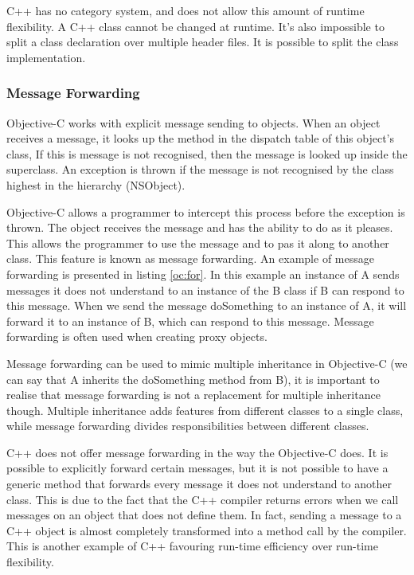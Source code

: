\documentclass[12pt, a4paper, twocolumn]{article}
\begin{document}
C++ has no category system, and does not allow this amount of runtime flexibility. A C++ class cannot be changed at runtime. It's also impossible to split a class declaration over multiple header files. It is possible to split the class implementation. 

\subsubsection{Message Forwarding}
\label{sec:message}
Objective-C works with explicit message sending to objects. When an object receives a message, it looks up the method in the dispatch table of this object's class, If this is message is not recognised, then the message is looked up inside the superclass. An exception is thrown if the message is not recognised by the class highest in the hierarchy (NSObject).

Objective-C allows a programmer to intercept this process before the exception is thrown. The object receives the message  and has the ability to do as it pleases. This allows the programmer to use the message and to pas it along to another class. This feature is known as message forwarding. An example of message forwarding is presented in listing \ref{oc:for}. In this example an instance of A sends messages it does not understand to an instance of the B class if B can respond to this message. When we send the message doSomething to an instance of A, it will forward it to an instance of B, which can respond to this message. Message forwarding is often used when creating proxy objects.

Message forwarding can be used to mimic multiple inheritance in Objective-C (we can say that A inherits the doSomething method from B), it is important to realise that message forwarding is not a replacement for multiple inheritance though. Multiple inheritance adds features from different classes to a single class, while message forwarding divides responsibilities between different classes.

C++ does not offer message forwarding in the way the Objective-C does. It is possible to explicitly forward certain messages, but it is not possible to have a generic method that forwards every message it does not understand to another class. This is due to the fact that the C++ compiler returns errors when we call messages on an object that does not define them. In fact, sending a message to a C++ object is almost completely transformed into a method call by the compiler. This is another example of C++ favouring run-time efficiency over run-time flexibility.
\end{document}
